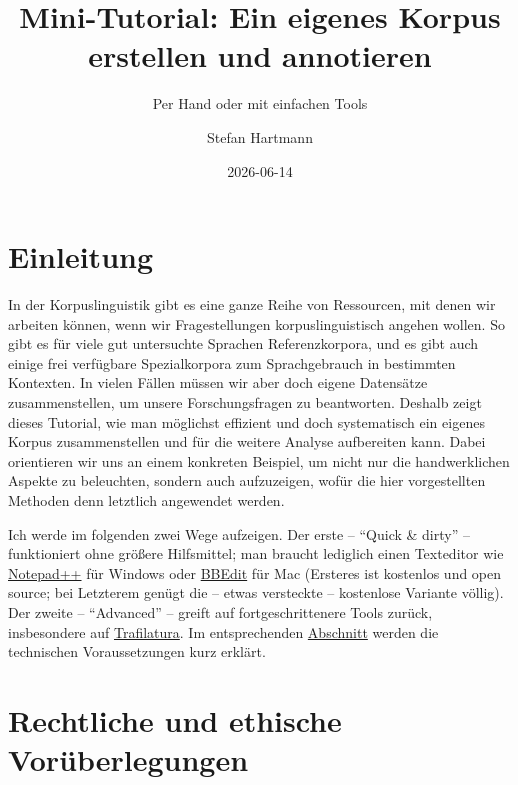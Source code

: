 \documentclass[
  letterpaper,
  DIV=11,
  numbers=noendperiod]{scrreprt}
\title{Mini-Tutorial: Ein eigenes Korpus erstellen und annotieren}
\subtitle{Per Hand oder mit einfachen Tools}
\author{Stefan Hartmann}
\date{2026-06-14}
\renewcommand*\contentsname{Table of contents}
\newcommand\contentsname{Table of contents}
\begin{document}
\maketitle

\renewcommand*\contentsname{Table of contents}
{
\hypersetup{linkcolor=}
\setcounter{tocdepth}{2}
\tableofcontents
}


\chapter{Einleitung}\label{einleitung}

In der Korpuslinguistik gibt es eine ganze Reihe von Ressourcen, mit
denen wir arbeiten können, wenn wir Fragestellungen korpuslinguistisch
angehen wollen. So gibt es für viele gut untersuchte Sprachen
Referenzkorpora, und es gibt auch einige frei verfügbare Spezialkorpora
zum Sprachgebrauch in bestimmten Kontexten. In vielen Fällen müssen wir
aber doch eigene Datensätze zusammenstellen, um unsere Forschungsfragen
zu beantworten. Deshalb zeigt dieses Tutorial, wie man möglichst
effizient und doch systematisch ein eigenes Korpus zusammenstellen und
für die weitere Analyse aufbereiten kann. Dabei orientieren wir uns an
einem konkreten Beispiel, um nicht nur die handwerklichen Aspekte zu
beleuchten, sondern auch aufzuzeigen, wofür die hier vorgestellten
Methoden denn letztlich angewendet werden.

Ich werde im folgenden zwei Wege aufzeigen. Der erste -- ``Quick \&
dirty'' -- funktioniert ohne größere Hilfsmittel; man braucht lediglich
einen Texteditor wie \href{https://notepad-plus-plus.org/}{Notepad++}
für Windows oder
\href{https://www.barebones.com/products/bbedit/index.html}{BBEdit} für
Mac (Ersteres ist kostenlos und open source; bei Letzterem genügt die --
etwas versteckte -- kostenlose Variante völlig). Der zweite --
``Advanced'' -- greift auf fortgeschrittenere Tools zurück, insbesondere
auf \href{https://trafilatura.readthedocs.io/en/latest/\#}{Trafilatura}.
Im entsprechenden \hyperref[technik]{Abschnitt} werden die technischen
Voraussetzungen kurz erklärt.


\chapter{Rechtliche und ethische
Vorüberlegungen}\label{rechtliche-und-ethische-voruxfcberlegungen}
\end{document}
